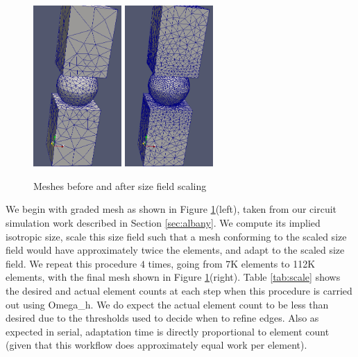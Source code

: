 \begin{figure}
\begin{center}
\includegraphics[width=0.3\textwidth]{scale_7k.png}
\includegraphics[width=0.3\textwidth]{scale_112k.png}
\caption{
Meshes before and after size field scaling}
\label{fig:scale}
\end{center}
\end{figure}

We begin with graded mesh as shown in Figure \ref{fig:scale}(left),
taken from our circuit simulation work described in Section \ref{sec:albany}.
We compute its implied isotropic size, scale this size field such
that a mesh conforming to the scaled size field would have
approximately twice the elements, and adapt to the scaled size
field.
We repeat this procedure $4$ times, going from 7K elements to 112K elements,
with the final mesh shown in Figure \ref{fig:scale}(right).
Table \ref{tab:scale} shows the desired and actual element
counts at each step when this procedure is carried out
using Omega\_h.
We do expect the actual element count to be less than desired
due to the thresholds used to decide when to refine edges.
Also as expected in serial, adaptation time is directly
proportional to element count (given that this workflow
does approximately equal work per element).

